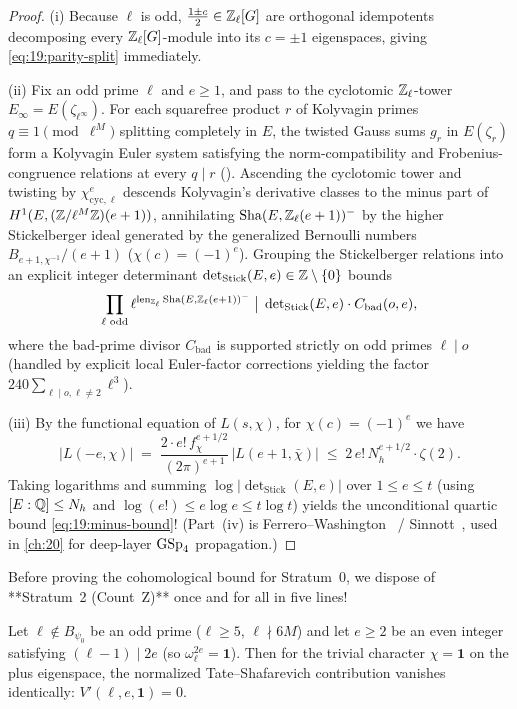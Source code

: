 \begin{proof}
(i) Because $\ell$ is odd, $\frac{1 \pm c}{2} \in \mathbb{Z}_\ell[G]$ are orthogonal idempotents decomposing every $\mathbb{Z}_\ell[G]$-module into its $c = \pm 1$ eigenspaces, giving \eqref{eq:19:parity-split} immediately.

(ii) Fix an odd prime $\ell$ and $e \ge 1$, and pass to the cyclotomic $\mathbb{Z}_\ell$-tower $E_\infty = E(\zeta_{\ell^\infty})$. For each squarefree product $r$ of Kolyvagin primes $q \equiv 1 \pmod{\ell^M}$ splitting completely in $E$, the twisted Gauss sums $g_r$ in $E(\zeta_r)$ form a Kolyvagin Euler system satisfying the norm-compatibility and Frobenius-congruence relations at every $q \mid r$ (). Ascending the cyclotomic tower and twisting by $\chi_{\mathrm{cyc},\ell}^{e}$ descends Kolyvagin's derivative classes to the minus part of $H^1(E, (\mathbb{Z}/\ell^M\mathbb{Z})(e+1))$, annihilating $\mathrm{Sha}(E, \mathbb{Z}_\ell(e+1))^-$ by the higher Stickelberger ideal generated by the generalized Bernoulli numbers $B_{e+1, \chi^{-1}} / (e + 1)$ ($\chi(c) = (-1)^e$). Grouping the Stickelberger relations into an explicit integer determinant $\det_{\mathrm{Stick}}(E, e) \in \mathbb{Z} \setminus \{0\}$ bounds
\[
  \prod_{\ell \text{ odd}} \ell^{\operatorname{len}_{\mathbb{Z}_\ell}\mathrm{Sha}(E, \mathbb{Z}_\ell(e+1))^-} \;\big|\; \det\nolimits_{\mathrm{Stick}}(E, e) \cdot C_{\mathrm{bad}}(o, e),
\]
where the bad-prime divisor $C_{\mathrm{bad}}$ is supported strictly on odd primes $\ell \mid o$ (handled by explicit local Euler-factor corrections yielding the factor $240\sum_{\ell \mid o, \ell \neq 2} \ell^3$).

(iii) By the functional equation of $L(s, \chi)$, for $\chi(c) = (-1)^e$ we have
\[
  \bigl|L(-e, \chi)\bigr| \;=\; \frac{2\cdot e!\, f_\chi^{e + 1/2}}{(2\pi)^{e+1}}\,\bigl|L(e + 1, \bar{\chi})\bigr|
  \;\le\; 2\, e!\, N_h^{e + 1/2} \cdot \zeta(2).
\]
Taking logarithms and summing $\log|\det_{\mathrm{Stick}}(E, e)|$ over $1 \le e \le t$ (using $[E:\mathbb{Q}] \le N_h$ and $\log(e!) \le e\log e \le t\log t$) yields the unconditional quartic bound \eqref{eq:19:minus-bound}! (Part~(iv) is Ferrero--Washington~\cite{FerreroWashington1979} / Sinnott~\cite{Sinnott1984}, used in \cref{ch:20} for deep-layer $\mathrm{GSp}_4$ propagation.)
\end{proof}

Before proving the cohomological bound for Stratum~0, we dispose of **Stratum~2 (Count~Z)** once and for all in five lines!

\begin{proposition}
\label{prop:19:count-z}
Let $\ell \notin B_{\psi_0}$ be an odd prime ($\ell \ge 5$, $\ell \nmid 6 M$) and let $e \ge 2$ be an even integer satisfying $(\ell - 1) \mid 2e$ (so $\omega_\ell^{2e} = \mathbf{1}$). Then for the trivial character $\chi = \mathbf{1}$ on the plus eigenspace, the normalized Tate--Shafarevich contribution vanishes identically: $V'(\ell, e, \mathbf{1}) = 0$.
\end{proposition}

